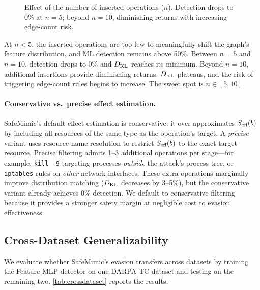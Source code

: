 \begin{figure}[t]
    \centering
    \caption{Effect of the number of inserted operations ($n$). Detection drops to 0\% at $n=5$; beyond $n=10$, diminishing returns with increasing edge-count risk.}
    \label{fig:nops}
\end{figure}
At $n{<}5$, the inserted operations are too few to meaningfully shift the graph's feature distribution, and ML detection remains above 50\%.
Between $n{=}5$ and $n{=}10$, detection drops to 0\% and $D_{\text{KL}}$ reaches its minimum.
Beyond $n{=}10$, additional insertions provide diminishing returns: $D_{\text{KL}}$ plateaus, and the risk of triggering edge-count rules begins to increase.
The sweet spot is $n \in [5, 10]$.

\paragraph{Conservative vs.\ precise effect estimation.}
SafeMimic's default effect estimation is conservative: it over-approximates $S_{\text{eff}}(b)$ by including all resources of the same type as the operation's target.
A \emph{precise} variant uses resource-name resolution to restrict $S_{\text{eff}}(b)$ to the exact target resource.
Precise filtering admits 1--3 additional operations per stage---for example, \texttt{kill -9} targeting processes \emph{outside} the attack's process tree, or \texttt{iptables} rules on \emph{other} network interfaces.
These extra operations marginally improve distribution matching ($D_{\text{KL}}$ decreases by 3--5\%), but the conservative variant already achieves 0\% detection.
We default to conservative filtering because it provides a stronger safety margin at negligible cost to evasion effectiveness.

\subsection{Cross-Dataset Generalizability}
\label{sec:eval:generalizability}

We evaluate whether SafeMimic's evasion transfers across datasets by training the Feature-MLP detector on one DARPA TC dataset and testing on the remaining two.
\cref{tab:crossdataset} reports the results.

